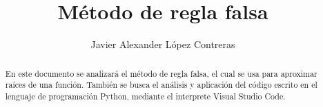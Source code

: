 \documentclass{rmf-d}
\begin{document}




\title{Método de regla falsa
\vspace{-6pt}}
\author{Javier Alexander López Contreras }

\address{Facultad de Ciencias Físico Matemáticas (FCFM), Universidad Autónoma de Coahuila, Campus Campo redondo }
\\

\maketitle




\begin{center}
\end{center}


\begin{abstract}
En este documento se analizará el método de regla falsa, el cual se usa para aproximar raíces de una función. También se busca el análisis y aplicación del código escrito en el lenguaje de programación Python, mediante el interprete Visual Studio Code. 
\end{abstract}
\end{document}
